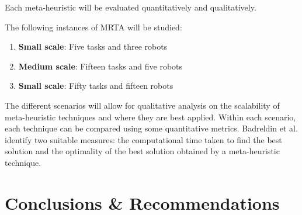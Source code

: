 \documentclass[a4paper]{article}
\begin{document}




Each meta-heuristic will be evaluated quantitatively and qualitatively.

The following instances of MRTA will be studied:
\begin{enumerate}
\item \textbf{Small scale}: Five tasks and three robots
\item \textbf{Medium scale}: Fifteen tasks and five robots
\item \textbf{Small scale}: Fifty tasks and fifteen robots
\end{enumerate}

The different scenarios will allow for qualitative analysis on the scalability of meta-heuristic techniques and where they are best applied. Within each scenario, each technique can be compared using some quantitative metrics. Badreldin et al. \cite{Badreldin} identify two suitable measures: the computational time taken to find the best solution and the optimality of the best solution obtained by a meta-heuristic technique.

\section{Conclusions \& Recommendations}

\end{document}
